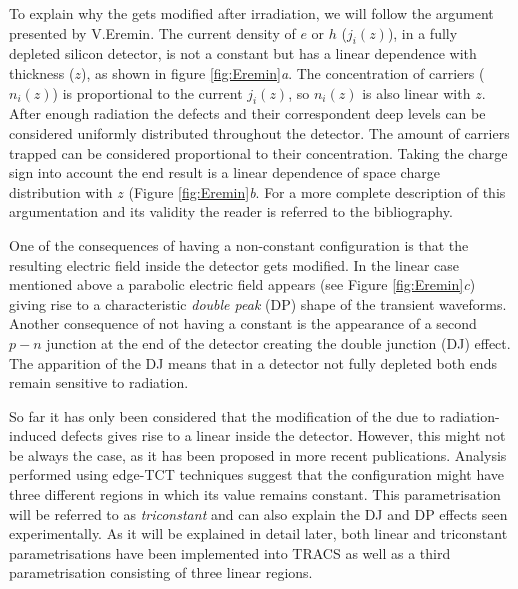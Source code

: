 To explain why the \neff gets modified after irradiation, we will follow the argument presented by V.Eremin\cite{Eremin}. The current density of $e$ or $h$ ($j_i(z)$), in a fully depleted silicon detector, is not a constant but has a linear dependence with thickness ($z$), as shown  in figure \ref{fig:Eremin}\emph{a}. The concentration of carriers ($n_i(z)$) is proportional to the current $j_i(z)$, so $n_i(z)$ is also linear with $z$. After enough radiation the defects and their correspondent deep levels can be considered uniformly distributed throughout the detector. The amount of carriers trapped can be considered proportional to their concentration. Taking the charge sign into account the end result is a linear dependence of space charge distribution with $z$ (Figure \ref{fig:Eremin}\emph{b}. For a more complete description of this argumentation and its validity the reader is referred to the bibliography.



One of the consequences of having a non-constant \neff configuration is that the resulting electric field inside the detector gets modified. In the linear case mentioned above a parabolic electric field appears (see Figure \ref{fig:Eremin}\emph{c}) giving rise to a characteristic \emph{double peak} (DP) shape of the transient waveforms. Another consequence of not having a constant \neff is the appearance of a second $p-n$ junction at the end of the detector creating the double junction (DJ) effect. The apparition of the DJ means that in a detector not fully depleted both ends remain sensitive to radiation.



So far it has only been considered that the modification of the \neff due to radiation-induced defects gives rise to a linear \neff inside the detector. However, this might not be always the case, as it has been proposed in more recent publications\cite{KramVertex}. Analysis performed using edge-TCT techniques suggest that the \neff configuration might have three different regions in which its value remains constant. This parametrisation will be referred to as \emph{triconstant} and can also explain the DJ and DP effects seen experimentally. As it will be explained in detail later, both linear and triconstant parametrisations have been implemented into TRACS as well as a third parametrisation consisting of three linear regions.  

